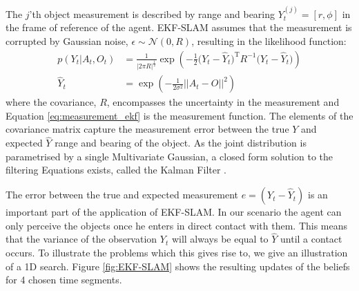 The $j$'th object measurement is described by range and bearing  $Y^{(j)}_t = [r,\phi]$ in the frame of reference of the agent.
EKF-SLAM assumes that the measurement is corrupted by Gaussian noise, $\epsilon \sim \mathcal{N}(0,R)$,
resulting in the likelihood function:
\begin{align} 
   p(Y_t|A_t,O_t) &= \frac{1}{|2\pi R|^{\frac{1}{2}}} \exp \left( -\frac{1}{2} \big(Y_t - \hat{Y}_t\big)^{\mathrm{T}}R^{-1}\big(Y_t - \hat{Y}_t\big) \right)\label{eq:lik-measurement}\\
   \hat{Y}_t      &= \exp\left(-\frac{1}{2\sigma^2} ||A_t - O ||^2 \right)\label{eq:measurement_ekf}
\end{align}
where the covariance, $R$, encompasses the uncertainty in the measurement and Equation \ref{eq:measurement_ekf} is the measurement function. The elements of the covariance matrix capture 
the measurement error between the true $Y$ and expected $\hat{Y}$ range and bearing of the object. As the joint distribution 
is parametrised by a single Multivariate Gaussian, a closed form solution to the filtering Equations exists, called the Kalman 
Filter \cite{SLAM_part1}. 

The error between the true and expected measurement $e = (Y_t - \hat{Y}_t)$ is an important part of the application of EKF-SLAM.
In our scenario the agent can only perceive the objects once he enters in direct contact with them. 
This means that the variance of the observation $Y_t$ will always be equal to $\hat{Y}$ until a contact occurs. 
To illustrate the problems which this gives rise to, we give an illustration of a 1D search. Figure \ref{fig:EKF-SLAM} shows the 
resulting updates of the beliefs for 4 chosen time segments.


